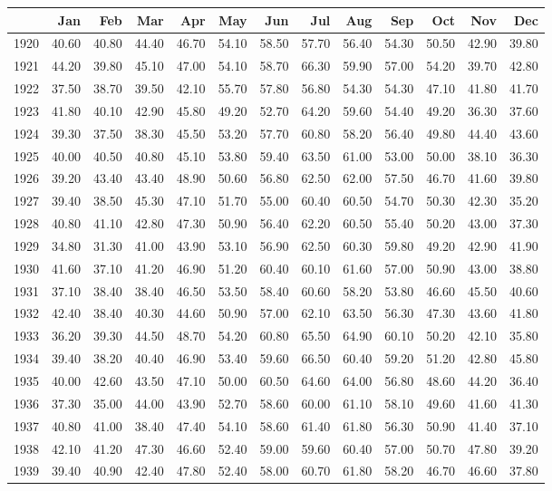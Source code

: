 \documentclass[10pt,a4paper]{article}
\author{Md Mujahedul Islam}
\begin{document}
\begin{table}[ht]
\centering
\begin{tabular}{rrrrrrrrrrrrr}
  \hline
 & Jan & Feb & Mar & Apr & May & Jun & Jul & Aug & Sep & Oct & Nov & Dec \\ 
  \hline
1920 & 40.60 & 40.80 & 44.40 & 46.70 & 54.10 & 58.50 & 57.70 & 56.40 & 54.30 & 50.50 & 42.90 & 39.80 \\ 
  1921 & 44.20 & 39.80 & 45.10 & 47.00 & 54.10 & 58.70 & 66.30 & 59.90 & 57.00 & 54.20 & 39.70 & 42.80 \\ 
  1922 & 37.50 & 38.70 & 39.50 & 42.10 & 55.70 & 57.80 & 56.80 & 54.30 & 54.30 & 47.10 & 41.80 & 41.70 \\ 
  1923 & 41.80 & 40.10 & 42.90 & 45.80 & 49.20 & 52.70 & 64.20 & 59.60 & 54.40 & 49.20 & 36.30 & 37.60 \\ 
  1924 & 39.30 & 37.50 & 38.30 & 45.50 & 53.20 & 57.70 & 60.80 & 58.20 & 56.40 & 49.80 & 44.40 & 43.60 \\ 
  1925 & 40.00 & 40.50 & 40.80 & 45.10 & 53.80 & 59.40 & 63.50 & 61.00 & 53.00 & 50.00 & 38.10 & 36.30 \\ 
  1926 & 39.20 & 43.40 & 43.40 & 48.90 & 50.60 & 56.80 & 62.50 & 62.00 & 57.50 & 46.70 & 41.60 & 39.80 \\ 
  1927 & 39.40 & 38.50 & 45.30 & 47.10 & 51.70 & 55.00 & 60.40 & 60.50 & 54.70 & 50.30 & 42.30 & 35.20 \\ 
  1928 & 40.80 & 41.10 & 42.80 & 47.30 & 50.90 & 56.40 & 62.20 & 60.50 & 55.40 & 50.20 & 43.00 & 37.30 \\ 
  1929 & 34.80 & 31.30 & 41.00 & 43.90 & 53.10 & 56.90 & 62.50 & 60.30 & 59.80 & 49.20 & 42.90 & 41.90 \\ 
  1930 & 41.60 & 37.10 & 41.20 & 46.90 & 51.20 & 60.40 & 60.10 & 61.60 & 57.00 & 50.90 & 43.00 & 38.80 \\ 
  1931 & 37.10 & 38.40 & 38.40 & 46.50 & 53.50 & 58.40 & 60.60 & 58.20 & 53.80 & 46.60 & 45.50 & 40.60 \\ 
  1932 & 42.40 & 38.40 & 40.30 & 44.60 & 50.90 & 57.00 & 62.10 & 63.50 & 56.30 & 47.30 & 43.60 & 41.80 \\ 
  1933 & 36.20 & 39.30 & 44.50 & 48.70 & 54.20 & 60.80 & 65.50 & 64.90 & 60.10 & 50.20 & 42.10 & 35.80 \\ 
  1934 & 39.40 & 38.20 & 40.40 & 46.90 & 53.40 & 59.60 & 66.50 & 60.40 & 59.20 & 51.20 & 42.80 & 45.80 \\ 
  1935 & 40.00 & 42.60 & 43.50 & 47.10 & 50.00 & 60.50 & 64.60 & 64.00 & 56.80 & 48.60 & 44.20 & 36.40 \\ 
  1936 & 37.30 & 35.00 & 44.00 & 43.90 & 52.70 & 58.60 & 60.00 & 61.10 & 58.10 & 49.60 & 41.60 & 41.30 \\ 
  1937 & 40.80 & 41.00 & 38.40 & 47.40 & 54.10 & 58.60 & 61.40 & 61.80 & 56.30 & 50.90 & 41.40 & 37.10 \\ 
  1938 & 42.10 & 41.20 & 47.30 & 46.60 & 52.40 & 59.00 & 59.60 & 60.40 & 57.00 & 50.70 & 47.80 & 39.20 \\ 
  1939 & 39.40 & 40.90 & 42.40 & 47.80 & 52.40 & 58.00 & 60.70 & 61.80 & 58.20 & 46.70 & 46.60 & 37.80 \\ 
   \hline
\end{tabular}
\end{table}
\end{document}
